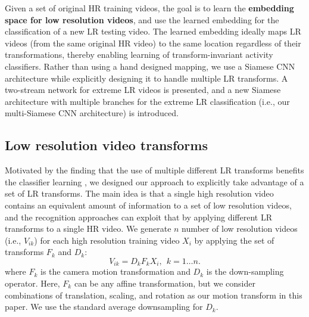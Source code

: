 \documentclass[letterpaper]{article} %
\begin{document}
Given a set of original HR training videos, the goal is to learn the \textbf{embedding space for low resolution videos}, and use the learned embedding for the classification of a new LR testing video. The learned embedding ideally maps LR videos (from the same original HR video) to the same location regardless of their transformations, thereby enabling learning of transform-invariant activity classifiers. Rather than using a hand designed mapping, we use a Siamese CNN architecture while explicitly designing it to handle multiple LR transforms. A two-stream network for extreme LR videos is presented, and a new Siamese architecture with multiple branches for the extreme LR classification (i.e., our multi-Siamese CNN architecture) is introduced.




\subsection{Low resolution video transforms}
\label{subsec:lr}





Motivated by the finding that the use of multiple different LR transforms benefits the classifier learning \cite{ryoo17privacy}, we designed our approach to explicitly take advantage of a set of LR transforms. The main idea is that a single high resolution video contains an equivalent amount of information to a set of low resolution videos, and the recognition approaches can exploit that by applying different LR transforms to a single HR video. We generate $n$ number of low resolution videos (i.e., $V_{ik}$) for each high resolution training video $X_i$ by applying the set of transforms $F_k$ and $D_k$:
\begin{equation}
    V_{ik} = D_k F_k X_i, ~~k = 1 \ldots n.
\end{equation}
where $F_k$ is the camera motion transformation and $D_k$ is the down-sampling operator. Here, $F_k$ can be any affine transformation, but we consider combinations of translation, scaling, and rotation as our motion transform in this paper. We use the standard average downsampling for $D_k$.
\end{document}
